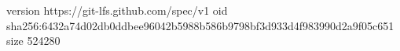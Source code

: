 version https://git-lfs.github.com/spec/v1
oid sha256:6432a74d02db0ddbee96042b5988b586b9798bf3d933d4f983990d2a9f05c651
size 524280
